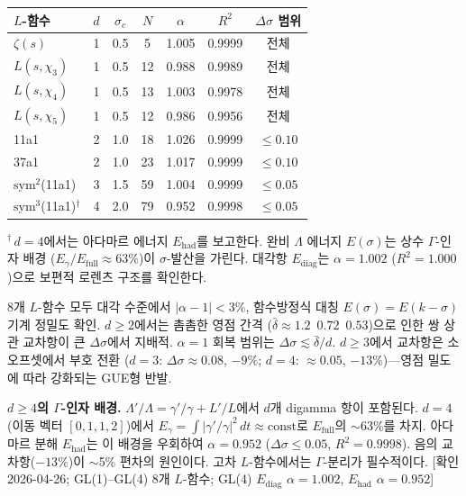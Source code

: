 \documentclass[11pt, a4paper]{article}
\theoremstyle{definition}
\theoremstyle{plain}
\begin{document}
\begin{enumerate}
\smallskip
\begin{center}
\small
\begin{tabular}{@{}lcccccc@{}}
\toprule
$L$-함수 & $d$ & $\sigma_c$ & $N$ & $\alpha$ & $R^{2}$ & $\Delta\sigma$ 범위 \\
\midrule
$\zeta(s)$ & 1 & 0.5 & 5 & 1.005 & 0.9999 & 전체 \\
$L(s,\chi_3)$ & 1 & 0.5 & 12 & 0.988 & 0.9989 & 전체 \\
$L(s,\chi_4)$ & 1 & 0.5 & 13 & 1.003 & 0.9978 & 전체 \\
$L(s,\chi_5)$ & 1 & 0.5 & 12 & 0.986 & 0.9956 & 전체 \\
\midrule
11a1 & 2 & 1.0 & 18 & 1.026 & 0.9999 & $\leq 0.10$ \\
37a1 & 2 & 1.0 & 23 & 1.017 & 0.9999 & $\leq 0.10$ \\
\midrule
$\mathrm{sym}^2$(11a1) & 3 & 1.5 & 59 & 1.004 & 0.9999 & $\leq 0.05$ \\
\midrule
$\mathrm{sym}^3$(11a1)${}^\dagger$ & 4 & 2.0 & 79 & 0.952 & 0.9998 & $\leq 0.05$ \\
\bottomrule
\end{tabular}
\end{center}

\noindent
${}^\dagger$\,$d=4$에서는 아다마르 에너지 $E_{\mathrm{had}}$를 보고한다.
완비 $\Lambda$ 에너지 $E(\sigma)$는 상수 $\Gamma$-인자 배경
($E_\gamma/E_{\mathrm{full}}\approx 63\%$)이 $\sigma$-발산을 가린다.
대각항 $E_{\mathrm{diag}}$는 $\alpha=1.002$ ($R^2=1.000$)으로
보편적 로렌츠 구조를 확인한다.

\smallskip\noindent
8개 $L$-함수 모두 대각 수준에서 $|\alpha-1|<3\%$, 함수방정식 대칭
$E(\sigma)=E(k{-}\sigma)$ 기계 정밀도 확인.
$d\geq 2$에서는 촘촘한 영점 간격
($\bar\delta\approx 1.2$~$0.72$~$0.53$)으로 인한 쌍 상관 교차항이
큰 $\Delta\sigma$에서 지배적.
$\alpha=1$ 회복 범위는 $\Delta\sigma\lesssim\bar\delta/d$.
$d\geq 3$에서 교차항은 소 오프셋에서 부호 전환
($d=3$: $\Delta\sigma\approx 0.08$, $-9\%$;
$d=4$: $\approx 0.05$, $-13\%$)---영점 밀도에 따라 강화되는 GUE형 반발.

\smallskip\noindent
\textbf{$d\geq 4$의 $\Gamma$-인자 배경.}\;
$\Lambda'/\Lambda = \gamma'/\gamma + L'/L$에서 $d$개 digamma 항이 포함된다.
$d=4$ (이동 벡터 $[0,1,1,2]$)에서
$E_\gamma=\int|\gamma'/\gamma|^2\,dt \approx \text{const}$로
$E_{\mathrm{full}}$의 $\sim$63\%를 차지.
아다마르 분해 $E_{\mathrm{had}}$는 이 배경을 우회하여
$\alpha=0.952$ ($\Delta\sigma\leq 0.05$, $R^2=0.9998$).
음의 교차항($-13\%$)이 $\sim$5\% 편차의 원인이다.
고차 $L$-함수에서는 $\Gamma$-분리가 필수적이다.
[확인 2026-04-26; GL(1)--GL(4) 8개 $L$-함수;
GL(4) $E_{\mathrm{diag}}$ $\alpha=1.002$, $E_{\mathrm{had}}$ $\alpha=0.952$]


\end{enumerate}
\end{document}
